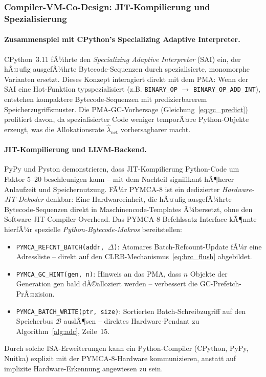 ﻿\documentclass[a4paper,12pt]{scrreprt}
\theoremstyle{definition}
\begin{document}
	\subsubsection{Compiler-VM-Co-Design: JIT-Kompilierung und Spezialisierung}

	\paragraph{Zusammenspiel mit CPython's Specializing Adaptive Interpreter.}
	CPython~3.11 fÃ¼hrte den \emph{Specializing Adaptive Interpreter} (SAI) ein,
	der hÃ¤ufig ausgefÃ¼hrte Bytecode-Sequenzen durch spezialisierte, monomorphe
	Varianten ersetzt. Dieses Konzept interagiert direkt mit dem PMA: Wenn der SAI
	eine Hot-Funktion typspezialisiert (z.B. \texttt{BINARY\_OP} $\to$
	\texttt{BINARY\_OP\_ADD\_INT}), entstehen kompaktere Bytecode-Sequenzen mit
	predizierbarerem Speicherzugriffsmuster. Die PMA-GC-Vorhersage
	(Gleichung~\eqref{eq:gc_predict}) profitiert davon, da spezialisierter Code
	weniger temporÃ¤re Python-Objekte erzeugt, was die Allokationsrate $\hat\lambda_{\mathrm{net}}$
	vorhersagbarer macht.

	\paragraph{JIT-Kompilierung und LLVM-Backend.}
	PyPy und Pyston demonstrieren, dass JIT-Kompilierung Python-Code um
	Faktor 5--20 beschleunigen kann -- mit dem Nachteil signifikant hÃ¶herer
	Anlaufzeit und Speichernutzung. FÃ¼r PYMCA-8 ist ein dedizierter
	\emph{Hardware-JIT-Dekoder} denkbar: Eine Hardwareeinheit, die hÃ¤ufig
	ausgefÃ¼hrte Bytecode-Sequenzen direkt in Maschinencode-Templates Ã¼bersetzt,
	ohne den Software-JIT-Compiler-Overhead. Das PYMCA-8-Befehlssatz-Interface
	kÃ¶nnte hierfÃ¼r spezielle \emph{Python-Bytecode-Makros} bereitstellen:
	\begin{itemize}[noitemsep]
		\item \texttt{PYMCA\_REFCNT\_BATCH(addr, $\Delta$)}: Atomares Batch-Refcount-Update
		fÃ¼r eine Adressliste -- direkt auf den CLRB-Mechanismus~\eqref{eq:brc_flush} abgebildet.
		\item \texttt{PYMCA\_GC\_HINT(gen, n)}: Hinweis an das PMA, dass $n$ Objekte
		der Generation $\mathrm{gen}$ bald dÃ©alloziert werden -- verbessert
		die GC-Prefetch-PrÃ¤zision.
		\item \texttt{PYMCA\_BATCH\_WRITE(ptr, size)}: Sortierten Batch-Schreibzugriff
		auf den Spei\-cherbus $\mathcal{B}$ auslÃ¶sen -- direktes Hardware-Pendant zu
		Algorithm~\ref{alg:adc}, Zeile~15.
	\end{itemize}
	Durch solche ISA-Erweiterungen kann ein Python-Compiler (CPython, PyPy, Nuitka)
	explizit mit der PYMCA-8-Hardware kommunizieren, anstatt auf implizite
	Hardware-Erkennung angewiesen zu sein.
\end{document}
